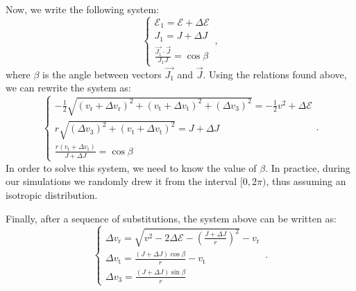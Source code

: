 \documentclass[desactivate]{aa}
\begin{document}
\begin{appendix}
    Now, we write the following system:
    \begin{equation}
        \begin{cases}
            \displaystyle \mathcal{E}_1 = \mathcal{E} + \Delta \mathcal{E} \\
            \displaystyle J_1 = J + \Delta J \\
            \displaystyle \frac{\vec{J_1} \cdot \vec{J}}{J_1 J} = \cos{\beta}
        \end{cases} \, ,
    \end{equation}
    where $\beta$ is the angle between vectors $\vec{J_1}$ and $\vec{J}$. Using the relations found above, we can rewrite the system as:
    \begin{equation}
        \begin{cases}
            \displaystyle -\frac{1}{2} \sqrt{(v_\mathrm{r}+\Delta v_\mathrm{r})^2 + (v_\mathrm{t}+\Delta v_\mathrm{t})^2 + (\Delta v_\mathrm{3})^2} = -\frac{1}{2} v^2 + \Delta \mathcal{E} \\
            \displaystyle r \sqrt{(\Delta v_\mathrm{3})^2 + (v_\mathrm{t} + \Delta v_\mathrm{t})^2} = J + \Delta J \\
            \displaystyle \frac{r (v_\mathrm{t} + \Delta v_\mathrm{t}) }{J + \Delta J} = \cos{\beta}
        \end{cases} .
    \end{equation}
    In order to solve this system, we need to know the value of $\beta$. In practice, during our simulations we randomly drew it from the interval $[0, 2 \pi)$, thus assuming an isotropic distribution.
    
    Finally, after a sequence of substitutions, the system above can be written as:
    \begin{equation}
        \begin{cases}
            \displaystyle \Delta v_\mathrm{r} = \sqrt{v^2 - 2 \Delta \mathcal{E} - \left(\frac{J + \Delta J}{r}\right)^2} - v_\mathrm{r} \\
            \displaystyle \Delta v_\mathrm{t} = \frac{(J + \Delta J) \cos{\beta}}{r} - v_\mathrm{t} \\
            \displaystyle \Delta v_\mathrm{3} = \frac{(J + \Delta J) \sin{\beta}}{r}
        \end{cases} \, .
    \end{equation}


\end{appendix}
\end{document}
